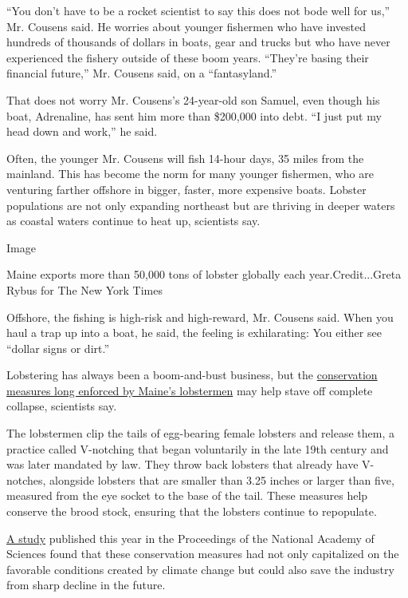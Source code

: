 ``You don't have to be a rocket scientist to say this does not bode well
for us,'' Mr. Cousens said. He worries about younger fishermen who have
invested hundreds of thousands of dollars in boats, gear and trucks but
who have never experienced the fishery outside of these boom years.
``They're basing their financial future,'' Mr. Cousens said, on a
``fantasyland.''

That does not worry Mr. Cousens's 24-year-old son Samuel, even though
his boat, Adrenaline, has sent him more than \$200,000 into debt. ``I
just put my head down and work,'' he said.

Often, the younger Mr. Cousens will fish 14-hour days, 35 miles from the
mainland. This has become the norm for many younger fishermen, who are
venturing farther offshore in bigger, faster, more expensive boats.
Lobster populations are not only expanding northeast but are thriving in
deeper waters as coastal waters continue to heat up, scientists say.

Image

Maine exports more than 50,000 tons of lobster globally each
year.Credit...Greta Rybus for The New York Times

Offshore, the fishing is high-risk and high-reward, Mr. Cousens said.
When you haul a trap up into a boat, he said, the feeling is
exhilarating: You either see ``dollar signs or dirt.''

Lobstering has always been a boom-and-bust business, but the
\href{http://www.maine.gov/dmr/science-research/species/lobster/guide/index.html}{conservation
measures long enforced by Maine's lobstermen} may help stave off
complete collapse, scientists say.

The lobstermen clip the tails of egg-bearing female lobsters and release
them, a practice called V-notching that began voluntarily in the late
19th century and was later mandated by law. They throw back lobsters
that already have V-notches, alongside lobsters that are smaller than
3.25 inches or larger than five, measured from the eye socket to the
base of the tail. These measures help conserve the brood stock, ensuring
that the lobsters continue to repopulate.

\href{http://www.pnas.org/content/early/2018/01/12/1711122115}{A study}
published this year in the Proceedings of the National Academy of
Sciences found that these conservation measures had not only capitalized
on the favorable conditions created by climate change but could also
save the industry from sharp decline in the future.

